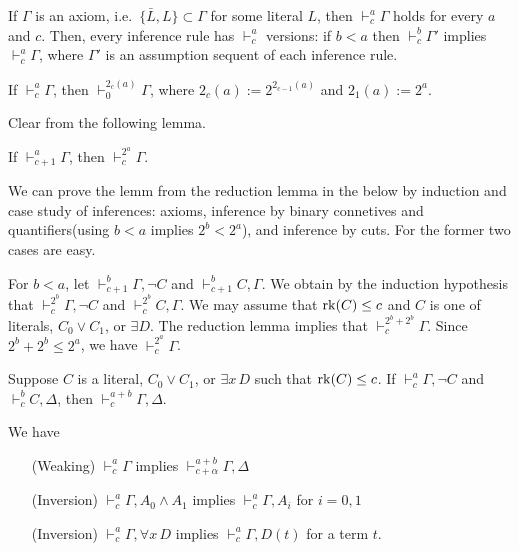 \documentclass{../../../small}
\begin{document}
If $\Gamma$ is an axiom, i.e.~$\{\bar L,L\}\subset\Gamma$ for some literal $L$, then $\vdash_c^a\Gamma$ holds for every $a$ and $c$.
Then, every inference rule has $\vdash_c^a$ versions: if $b<a$ then $\vdash_c^b\Gamma'$ implies $\vdash_c^a\Gamma$, where $\Gamma'$ is an assumption sequent of each inference rule.

\begin{thm*}
If $\vdash_c^a\Gamma$, then $\vdash_0^{2_c(a)}\Gamma$, where $2_c(a):=2^{2_{c-1}(a)}$ and $2_1(a):=2^a$.
\end{thm*}
\begin{pf}
Clear from the following lemma.
\end{pf}
\begin{lem*}
If $\vdash_{c+1}^a\Gamma$, then $\vdash_c^{2^a}\Gamma$.
\end{lem*}
\begin{pf}
We can prove the lemm from the reduction lemma in the below by induction and case study of inferences: axioms, inference by binary connetives and quantifiers(using $b<a$ implies $2^b<2^a$), and inference by cuts.
For the former two cases are easy.

For $b<a$, let $\vdash_{c+1}^b\Gamma,\neg C$ and $\vdash_{c+1}^bC,\Gamma$.
We obtain by the induction hypothesis that $\vdash_c^{2^b}\Gamma,\neg C$ and $\vdash_c^{2^b}C,\Gamma$.
We may assume that $\operatorname{rk}(C)\le c$ and $C$ is one of literals, $C_0\vee C_1$, or $\exists D$.
The reduction lemma implies that $\vdash_c^{2^b+2^b}\Gamma$.
Since $2^b+2^b\le2^a$, we have $\vdash_c^{2^a}\Gamma$.
\end{pf}
\begin{lem*}
Suppose $C$ is a literal, $C_0\vee C_1$, or $\exists x\, D$ such that $\operatorname{rk}(C)\le c$.
If $\vdash_c^a\Gamma,\neg C$ and $\vdash_c^bC,\Delta$, then $\vdash_c^{a+b}\Gamma,\Delta$.
\end{lem*}
We have
\begin{itemize}
\item[(Weaking)] $\vdash_c^a\Gamma$ implies $\vdash_{c+\alpha}^{a+b}\Gamma,\Delta$
\item[(Inversion)] $\vdash_c^a\Gamma,A_0\wedge A_1$ implies $\vdash_c^a\Gamma,A_i$ for $i=0,1$
\item[(Inversion)] $\vdash_c^a\Gamma,\forall x\,D$ implies $\vdash_c^a\Gamma,D(t)$ for a term $t$.
\end{itemize}
\end{document}
